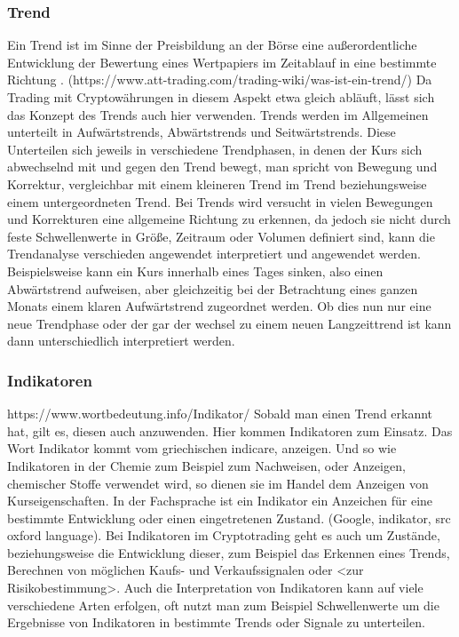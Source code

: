 \documentclass[12pt]{article}
\begin{document}
	\subsubsection{Trend}
		\glqq Ein Trend ist im Sinne der Preisbildung an der Börse eine außerordentliche Entwicklung der Bewertung eines Wertpapiers im Zeitablauf in eine bestimmte Richtung \grqq{}.  (https://www.att-trading.com/trading-wiki/was-ist-ein-trend/) Da Trading mit Cryptowährungen in diesem Aspekt etwa gleich abläuft, lässt sich das Konzept des Trends auch hier verwenden. Trends werden im Allgemeinen unterteilt in Aufwärtstrends, Abwärtstrends und Seitwärtstrends. Diese Unterteilen sich jeweils in verschiedene Trendphasen, in denen der Kurs sich abwechselnd mit und gegen den Trend bewegt, man spricht von Bewegung und Korrektur, vergleichbar mit einem kleineren Trend im Trend beziehungsweise einem untergeordneten Trend. Bei Trends wird versucht in vielen Bewegungen und Korrekturen eine allgemeine Richtung zu erkennen, da jedoch sie nicht durch feste Schwellenwerte in Größe, Zeitraum oder Volumen definiert sind, kann die Trendanalyse verschieden angewendet interpretiert und angewendet werden. Beispielsweise kann ein Kurs innerhalb eines Tages sinken, also einen Abwärtstrend aufweisen, aber gleichzeitig bei der Betrachtung eines ganzen Monats einem klaren Aufwärtstrend zugeordnet werden. Ob dies nun nur eine neue Trendphase oder der gar der wechsel zu einem neuen Langzeittrend ist kann dann unterschiedlich interpretiert werden.
	\subsubsection{Indikatoren}
		https://www.wortbedeutung.info/Indikator/ Sobald man einen Trend erkannt hat, gilt es, diesen auch anzuwenden. Hier kommen Indikatoren zum Einsatz. Das Wort Indikator kommt vom griechischen indicare, \glqq anzeigen\grqq{}. Und so wie Indikatoren in der Chemie zum Beispiel zum Nachweisen, oder Anzeigen, chemischer Stoffe verwendet wird, so dienen sie im Handel dem Anzeigen von Kurseigenschaften. In der Fachsprache ist ein Indikator ein Anzeichen für eine bestimmte Entwicklung oder einen eingetretenen Zustand. (Google, indikator, src oxford language). Bei Indikatoren im Cryptotrading geht es auch um Zustände, beziehungsweise die Entwicklung dieser, zum Beispiel das Erkennen eines Trends, Berechnen von möglichen Kaufs- und Verkaufssignalen oder <zur Risikobestimmung>. Auch die Interpretation von Indikatoren kann auf viele verschiedene Arten erfolgen, oft nutzt man zum Beispiel Schwellenwerte um die Ergebnisse von Indikatoren in bestimmte Trends oder Signale zu unterteilen.
\end{document}
